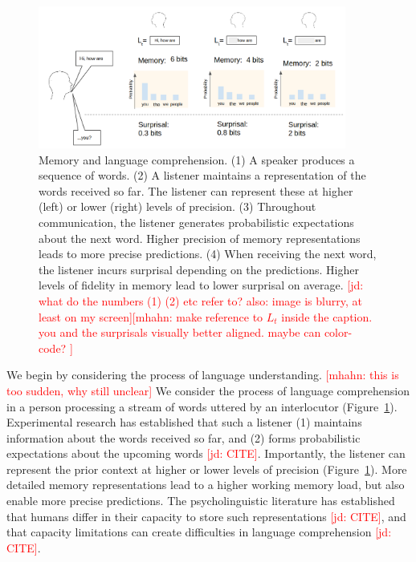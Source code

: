 \documentclass[12pt]{article}
\newcommand{\jd}[1]{\textcolor{Red}{[jd: #1]}}
\newcommand{\mhahn}[1]{\textcolor{Red}{[mhahn: #1]}}
\begin{document}
\begin{figure}
\centering
\includegraphics[width=0.9\textwidth]{figures-gdrive/communication.png}
	\caption{Memory and language comprehension. (1) A speaker produces a sequence of words. (2) A listener maintains a representation of the words received so far. The listener can represent these at higher (left) or lower (right) levels of precision. (3) Throughout communication, the listener generates probabilistic expectations about the next word. Higher precision of memory representations leads to more precise predictions. (4) When receiving the next word, the listener incurs surprisal depending on the predictions. Higher levels of fidelity in memory lead to lower surprisal on average. \jd{what do the numbers (1) (2) etc refer to? also: image is blurry, at least on my screen}\mhahn{make reference to $L_t$ inside the caption. you and the surprisals visually better aligned. maybe can color-code? }}
	\label{fig:communication}
\end{figure}

We begin by considering the process of language understanding.
\mhahn{this is too sudden, why still unclear}
We consider the process of language comprehension in a person processing a stream of words uttered by an interlocutor (Figure~\ref{fig:communication}).
Experimental research has established that such a listener (1) maintains information about the words received so far, and (2) forms probabilistic expectations about the upcoming words \jd{CITE}. %
Importantly, the listener can represent the prior context at higher or lower levels of precision (Figure~\ref{fig:communication}).
More detailed memory representations lead to a higher working memory load, but also enable more precise predictions.
The psycholinguistic literature has established that humans differ in their capacity to store such representations \jd{CITE}, and that capacity limitations can create difficulties in language comprehension \jd{CITE}.
\end{document}
